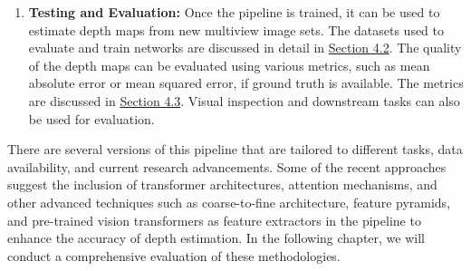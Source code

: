 \begin{enumerate}
\item \textbf{Testing and Evaluation:} Once the pipeline is trained, it can be used to estimate depth maps from new multiview image sets. The datasets used to evaluate and train networks are discussed in detail in \hyperref[sec:datasets]{Section 4.2}. The quality of the depth maps can be evaluated using various metrics, such as mean absolute error or mean squared error, if ground truth is available. The metrics are discussed in \hyperref[sec:metrics]{Section 4.3}. Visual inspection and downstream tasks can also be used for evaluation.

\end{enumerate}\par
There are several versions of this pipeline that are tailored to different tasks, data availability, and current research advancements. Some of the recent approaches suggest the inclusion of transformer architectures, attention mechanisms, and other advanced techniques such as coarse-to-fine architecture, feature pyramids, and pre-trained vision transformers as feature extractors in the pipeline to enhance the accuracy of depth estimation. In the following chapter, we will conduct a comprehensive evaluation of these methodologies.



